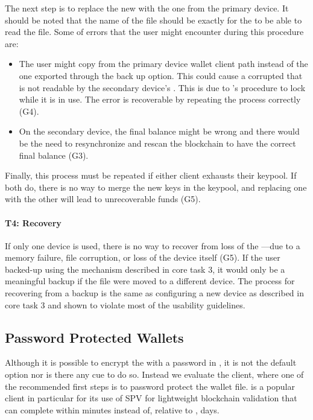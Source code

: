 The next step is to replace the new \walletfile with the one from the primary device. It should be noted that the name of the file should be exactly \walletfile for the \bitcoinclient to be able to read the file. Some of errors that the user might encounter during this procedure are:
\begin{itemize}
	\item The user might copy \walletfile from the primary device wallet client path instead of the one exported through the back up option. This could cause a corrupted \walletfile that is not readable by the secondary device's \bitcoinclient. This is due to \bitcoinclient's procedure to lock \walletfile while it is in use. The error is recoverable by repeating the process correctly (G4). 
	\item On the secondary device, the final balance might be wrong and there would be the need to resynchronize and rescan the blockchain to have the correct final balance (G3).
\end{itemize}

Finally, this process must be repeated if either client exhausts their keypool. If both do, there is no way to merge the new keys in the keypool, and replacing one \walletfile with the other will lead to unrecoverable funds (G5). 

\paragraph{T4: Recovery} 

If only one device is used, there is no way to recover from loss of the \walletfile---\eg due to a memory failure, file corruption, or loss of the device itself (G5). If the user backed-up \walletfile using the mechanism described in core task 3, it would only be a meaningful backup if the file were moved to a different device. The process for recovering from a backup is the same as configuring a new device as described in core task 3 and shown to violate most of the usability guidelines.


\subsection{Password Protected Wallets}

Although it is possible to encrypt the \walletfile with a password in \bitcoinclient, it is not the default option nor is there any cue to do so. Instead we evaluate the \multibit client, where one of the recommended first steps is to password protect the wallet file. \multibit is a popular client in particular for its use of SPV for lightweight blockchain validation that can complete within minutes instead of, relative to \bitcoinclient, days.

